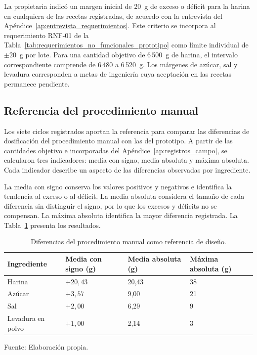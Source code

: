 La propietaria indicó un margen inicial de 20~g de exceso o déficit
para la harina en cualquiera de las recetas registradas, de acuerdo con
la entrevista del Apéndice~\ref{ap:entrevista_requerimientos}. Este
criterio se incorpora al requerimiento RNF-01 de la
Tabla~\ref{tab:requerimientos_no_funcionales_prototipo} como límite
individual de $\pm20$~g por lote. Para una cantidad objetivo de
6\,500~g de harina, el intervalo correspondiente comprende de
6\,480 a 6\,520~g. Los márgenes de azúcar, sal y levadura corresponden
a metas de ingeniería cuya aceptación en las recetas permanece pendiente.

\subsection{Referencia del procedimiento manual}

Los siete ciclos registrados aportan la referencia para comparar las
diferencias de dosificación del procedimiento manual con las del
prototipo. A partir de las cantidades objetivo e incorporadas del
Apéndice~\ref{ap:registros_campo}, se calcularon tres indicadores:
media con signo, media absoluta y máxima absoluta. Cada indicador
describe un aspecto de las diferencias observadas por ingrediente.

La media con signo conserva los valores positivos y negativos e
identifica la tendencia al exceso o al déficit. La media absoluta
considera el tamaño de cada diferencia sin distinguir el signo, por
lo que los excesos y déficits no se compensan. La máxima absoluta
identifica la mayor diferencia registrada. La
Tabla~\ref{tab:errores_referencia_diseno} presenta los resultados.

\begin{table}[H]
    \centering
    \caption{Diferencias del procedimiento manual como referencia de diseño.}
    \label{tab:errores_referencia_diseno}
    \footnotesize
    \begin{tabularx}{\textwidth}{lXXX}
        \toprule
        \textbf{Ingrediente} & \textbf{Media con signo (g)} &
        \textbf{Media absoluta (g)} & \textbf{Máxima absoluta (g)} \\
        \midrule
        Harina & $+20{,}43$ & 20,43 & 38 \\
        Azúcar & $+3{,}57$ & 9,00 & 21 \\
        Sal & $+2{,}00$ & 6,29 & 9 \\
        Levadura en polvo & $+1{,}00$ & 2,14 & 3 \\
        \bottomrule
    \end{tabularx}
    \par\smallskip
    Fuente: Elaboración propia.
\end{table}

